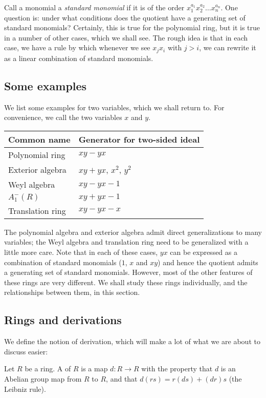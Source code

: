 \documentclass[a4paper]{amsart}
\begin{document}
Call a monomial a {\em standard monomial} if it is of the order
$x_1^{a_1}x_2^{a_2}\ldots x_n^{a_n}$. One question is: under what
conditions does the quotient have a generating set of standard monomials?
Certainly, this is true for the polynomial ring, but it is true in a
number of other cases, which we shall see. The rough idea is that in
each case, we have a rule by which whenever we see $x_jx_i$ with $j >
i$, we can rewrite it as a linear combination of standard monomials.

\subsection{Some examples}

We list some examples for two variables, which we shall return to.
For convenience, we call the two variables $x$ and $y$.

\begin{tabular}{|l|l|}
  \hline
  Common name & Generator for two-sided ideal\\
  \hline
  Polynomial ring & $xy - yx$\\
  Exterior algebra & $xy + yx$, $x^2$, $y^2$\\
  Weyl algebra & $xy - yx - 1$\\
  $A_1^-(R)$  & $xy + yx - 1$\\
  Translation ring & $xy - yx - x$\\
  \hline
\end{tabular}

The polynomial algebra and exterior algebra admit direct
generalizations to many variables; the Weyl algebra and translation
ring need to be generalized with a little more care. Note that in each
of these cases, $yx$ can be expressed as a combination of standard
monomials ($1$, $x$ and $xy$) and hence the quotient admits a
generating set of standard monomials. However, most of the other
features of these rings are very different. We shall study these rings
individually, and the relationships between them, in this section.


\subsection{Rings and derivations}

We define the notion of derivation, which will make a lot of what
we are about to discuss easier:

\begin{definer}[Derivation]
  Let $R$ be a ring. A  of $R$ is a map $d: R \to R$
  with the property that $d$ is an Abelian group map from $R$ to $R$,
  and that $d(rs) = r(ds) + (dr)s$ (the Leibniz rule).
\end{definer}
\end{document}
